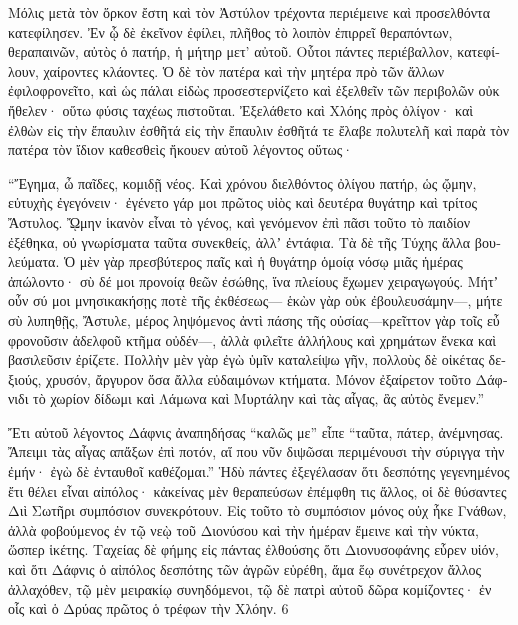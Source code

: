 \documentclass{book}
\begin{document}
\begin{pairs}
\begin{Leftside}
\begin{greek}
  Μόλις μετὰ τὸν ὅρκον ἔστη καὶ τὸν Ἀστύλον τρέχοντα περιέμεινε καὶ προσελθόντα κατεφίλησεν. Ἐν ᾧ δὲ ἐκεῖνον ἐφίλει, πλῆθος τὸ λοιπὸν ἐπιρρεῖ θεραπόντων, θεραπαινῶν, αὐτὸς ὁ πατήρ, ἡ μήτηρ μετ’ αὐτοῦ. Οὗτοι πάντες περιέβαλλον, κατεφίλουν, χαίροντες κλάοντες.  Ὁ δὲ τὸν πατέρα καὶ τὴν μητέρα πρὸ τῶν ἄλλων ἐφιλοφρονεῖτο, καὶ ὡς πάλαι εἰδὼς προσεστερνίζετο καὶ ἐξελθεῖν τῶν περιβολῶν οὐκ ἤθελεν· οὕτω φύσις ταχέως πιστοῦται. Ἐξελάθετο καὶ Χλόης πρὸς ὀλίγον· καὶ ἐλθὼν εἰς τὴν ἔπαυλιν ἐσθῆτά εἰς τὴν ἔπαυλιν ἐσθῆτά τε ἔλαβε πολυτελῆ καὶ παρὰ τὸν πατέρα τὸν ἴδιον καθεσθεὶς ἤκουεν αὐτοῦ λέγοντος οὕτως·
\pend


  “Ἔγημα, ὦ παῖδες, κομιδῇ νέος. Καὶ χρόνου διελθόντος ὀλίγου πατήρ, ὡς ᾤμην, εὐτυχὴς ἐγεγόνειν· ἐγένετο γάρ μοι πρῶτος υἱὸς καὶ δευτέρα θυγάτηρ καὶ τρίτος Ἄστυλος. ᾬμην ἱκανὸν εἶναι τὸ γένος, καὶ γενόμενον ἐπὶ πᾶσι τοῦτο τὸ παιδίον ἐξέθηκα, οὐ γνωρίσματα ταῦτα συνεκθείς, ἀλλʼ ἐντάφια.  Τὰ δὲ τῆς Τύχης ἄλλα βουλεύματα. Ὁ μὲν γὰρ πρεσβύτερος παῖς καὶ ἡ θυγάτηρ ὁμοίᾳ νόσῳ μιᾶς ἡμέρας ἀπώλοντο· σὺ δέ μοι προνοίᾳ θεῶν ἐσώθης, ἵνα πλείους ἔχωμεν χειραγωγούς.  Μήτʼ οὖν σύ μοι μνησικακήσῃς ποτὲ τῆς ἐκθέσεως— ἑκὼν γὰρ οὐκ ἐβουλευσάμην—, μήτε σὺ λυπηθῇς, Ἄστυλε, μέρος ληψόμενος ἀντὶ πάσης τῆς οὐσίας—κρεῖττον γὰρ τοῖς εὖ φρονοῦσιν ἀδελφοῦ κτῆμα οὐδέν—, ἀλλὰ φιλεῖτε ἀλλήλους καὶ χρημάτων ἕνεκα καὶ βασιλεῦσιν ἐρίζετε.  Πολλὴν μὲν γὰρ ἐγὼ ὑμῖν καταλείψω γῆν, πολλοὺς δὲ οἰκέτας δεξιούς, χρυσόν, ἄργυρον ὅσα ἄλλα εὐδαιμόνων κτήματα. Μόνον ἐξαίρετον τοῦτο Δάφνιδι τὸ χωρίον δίδωμι καὶ Λάμωνα καὶ Μυρτάλην καὶ τὰς αἶγας, ἃς αὐτὸς ἔνεμεν.”
\pend


  Ἔτι αὐτοῦ λέγοντος Δάφνις ἀναπηδήσας “καλῶς με” εἶπε “ταῦτα, πάτερ, ἀνέμνησας. Ἄπειμι τὰς αἶγας απἄξων ἐπὶ ποτόν, αἵ που νῦν διψῶσαι περιμένουσι τὴν σύριγγα τὴν ἐμήν· ἐγὼ δὲ ἐνταυθοῖ καθέζομαι.”  Ἡδὺ πάντες ἐξεγέλασαν ὅτι δεσπότης γεγενημένος ἔτι θέλει εἶναι αἰπόλος· κἀκείνας μὲν θεραπεύσων ἐπέμφθη τις ἄλλος, οἱ δὲ θύσαντες Διὶ Σωτῆρι συμπόσιον συνεκρότουν. Εἰς τοῦτο τὸ συμπόσιον μόνος οὐχ ἧκε Γνάθων, ἀλλὰ φοβούμενος ἐν τῷ νεῲ τοῦ Διονύσου καὶ τὴν ἡμέραν ἔμεινε καὶ τὴν νύκτα, ὥσπερ ἱκέτης.  Ταχείας δὲ φήμης εἰς πάντας ἐλθούσης ὅτι Διονυσοφάνης εὗρεν υἱόν, καὶ ὅτι Δάφνις ὁ αἰπόλος δεσπότης τῶν ἀγρῶν εὑρέθη, ἅμα ἕῳ συνέτρεχον ἄλλος ἀλλαχόθεν, τῷ μὲν μειρακίῳ συνηδόμενοι, τῷ δὲ πατρὶ αὐτοῦ δῶρα κομίζοντες· ἐν οἷς καὶ ὁ Δρύας πρῶτος ὁ τρέφων τὴν Χλόην. 6
\pend



\end{greek}
\end{Leftside}
\end{pairs}
\end{document}
